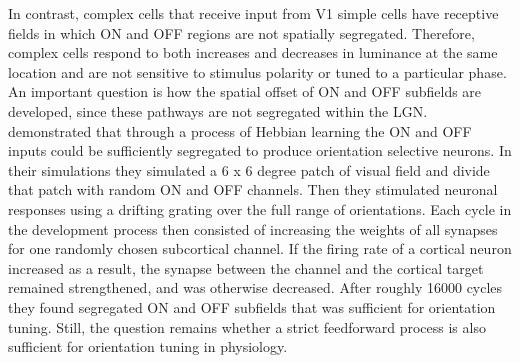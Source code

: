 \documentclass[12pt]{article}
\begin{document}
In contrast, complex cells that receive input from V1 simple cells have receptive fields in which ON and OFF regions are not spatially segregated. Therefore, complex cells respond to both increases and decreases in luminance at the same location and are not sensitive to stimulus polarity or tuned to a particular phase. An important question is how the spatial offset of ON and OFF subfields are developed, since these pathways are not segregated within the LGN. \textcite{nguyenModelOriginDevelopment2019} demonstrated that through a process of Hebbian learning the ON and OFF inputs could be sufficiently segregated to produce orientation selective neurons. In their simulations they simulated a 6 x 6 degree patch of visual field and divide that patch with random ON and OFF channels. Then they stimulated neuronal responses using a drifting grating over the full range of orientations. Each cycle in the development process then consisted of increasing the weights of all synapses for one randomly chosen subcortical channel. If the firing rate of a cortical neuron increased as a result, the synapse between the channel and the cortical target remained strengthened, and was otherwise decreased. After roughly 16000 cycles they found segregated ON and OFF subfields that was sufficient for orientation tuning. Still, the question remains whether a strict feedforward process is also sufficient for orientation tuning in physiology.
\end{document}
